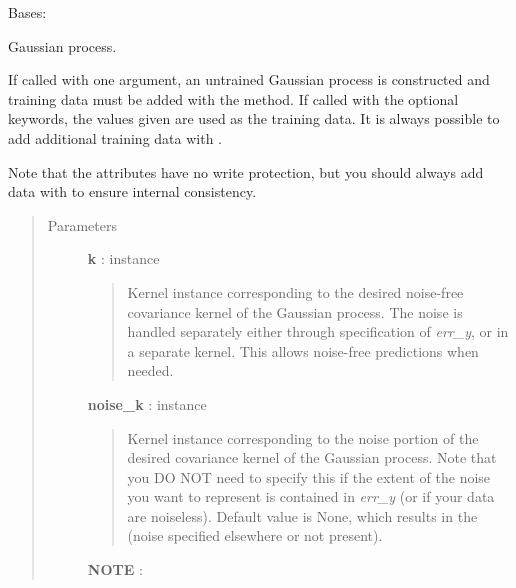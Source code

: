 \documentclass[letterpaper,10pt,english]{sphinxmanual}
\begin{document}
\begin{fulllineitems}
\label{gptools:gptools.gaussian_process.GaussianProcess}
Bases: 

Gaussian process.

If called with one argument, an untrained Gaussian process is
constructed and training data must be added with the {\hyperref[gptools:gptools.gaussian_process.GaussianProcess.add_data]{}} method.
If called with the optional keywords, the values given are used as the
training data. It is always possible to add additional training data
with {\hyperref[gptools:gptools.gaussian_process.GaussianProcess.add_data]{}}.

Note that the attributes have no write protection, but you should always
add data with {\hyperref[gptools:gptools.gaussian_process.GaussianProcess.add_data]{}} to ensure internal consistency.
\begin{quote}\begin{description}
\item[{Parameters }] \leavevmode
\textbf{k} : {\hyperref[gptools.kernel:gptools.kernel.core.Kernel]{}} instance
\begin{quote}

Kernel instance corresponding to the desired noise-free
covariance kernel of the Gaussian process. The noise is handled
separately either through specification of \emph{err\_y}, or in a
separate kernel. This allows noise-free predictions when needed.
\end{quote}

\textbf{noise\_k} : {\hyperref[gptools.kernel:gptools.kernel.core.Kernel]{}} instance
\begin{quote}

Kernel instance corresponding to the noise portion of the
desired covariance kernel of the Gaussian process. Note that you
DO NOT need to specify this if the extent of the noise you want
to represent is contained in \emph{err\_y} (or if your data are
noiseless). Default value is None, which results in the
{\hyperref[gptools.kernel:gptools.kernel.noise.ZeroKernel]{}} (noise specified elsewhere
or not present).
\end{quote}

\textbf{NOTE} :
\begin{quote}


\end{quote}
\end{description}
\end{quote}
\end{fulllineitems}
\end{document}
